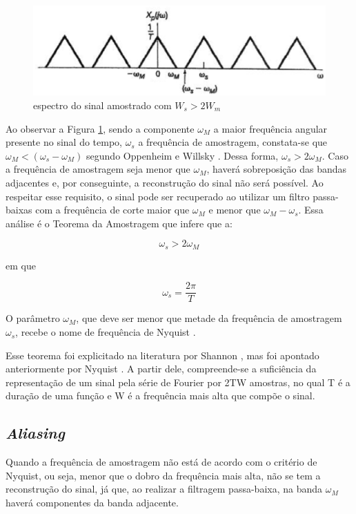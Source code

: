 \begin{figure}[h]
	\centering
    \includegraphics[scale=0.5]{figuras/fig03.eps}
	\caption{espectro do sinal amostrado com $W_s > 2W_m$ \cite{oppenheim2010sinais}}
	\label{fig03}
\end{figure}

Ao observar a Figura \ref{fig03}, sendo a componente $\omega_M$ a maior frequência angular presente no sinal do tempo, $\omega_s$ a frequência de amostragem, constata-se que $\omega_M < (\omega_s - \omega_M)$ segundo Oppenheim e Willsky \cite{oppenheim2010sinais}. Dessa forma, $\omega_s > 2\omega_M$. Caso a frequência de amostragem seja menor que $\omega_M$, haverá sobreposição das bandas adjacentes e, por conseguinte, a reconstrução do sinal não será possível. Ao respeitar esse requisito, o sinal pode ser recuperado ao utilizar um filtro passa-baixas com a frequência de corte maior que $\omega_M$ e menor que $\omega_M - \omega_s$.
Essa análise é o Teorema da Amostragem que infere que a:

\begin{equation} \label{eq:01}
\omega_s > 2\omega_M
\end{equation}

em que

\begin{equation} \label{eq:02}
\omega_s = \frac{2\pi}{T}
\end{equation}

O parâmetro $\omega_M$, que deve ser menor que metade da frequência de amostragem $\omega_s$, recebe o nome de frequência de Nyquist \cite{oppenheim2010sinais}.
\par
Esse teorema foi explicitado na literatura por Shannon \cite{Shannon}, mas foi apontado anteriormente por Nyquist \cite{nyquist}. A partir dele, compreende-se a suficiência da representação de um sinal pela série de Fourier por 2TW amostras, no qual T é a duração de uma função e W é a frequência mais alta que compõe o sinal.

\subsection{\textit{Aliasing}}
Quando a frequência de amostragem não está de acordo com o critério de Nyquist, ou seja, menor que o dobro da frequência mais alta, não se tem a reconstrução do sinal, já que, ao realizar a filtragem passa-baixa, na banda $\omega_M$ haverá componentes da banda adjacente.

